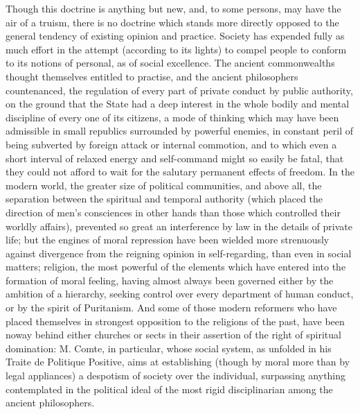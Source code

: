 \documentclass[12pt]{report}
\begin{document}
Though this doctrine is anything but new, and, to some persons, may have the air of a truism, there is no doctrine which stands more directly opposed to the general tendency of existing opinion and practice. Society has expended fully as much effort in the attempt (according to its lights) to compel people to conform to its notions of personal, as of social excellence. The ancient commonwealths thought themselves entitled to practise, and the ancient philosophers countenanced, the regulation of every part of private conduct by public authority, on the ground that the State had a deep interest in the whole bodily and mental discipline of every one of its citizens, a mode of thinking which may have been admissible in small republics surrounded by powerful enemies, in constant peril of being subverted by foreign attack or internal commotion, and to which even a short interval of relaxed energy and self-command might so easily be fatal, that they could not afford to wait for the salutary permanent effects of freedom. In the modern world, the greater size of political communities, and above all, the separation between the spiritual and temporal authority (which placed the direction of men's consciences in other hands than those which controlled their worldly affairs), prevented so great an interference by law in the details of private life; but the engines of moral repression have been wielded more strenuously against divergence from the reigning opinion in self-regarding, than even in social matters; religion, the most powerful of the elements which have entered into the formation of moral feeling, having almost always been governed either by the ambition of a hierarchy, seeking control over every department of human conduct, or by the spirit of Puritanism. And some of those modern reformers who have placed themselves in strongest opposition to the religions of the past, have been noway behind either churches or sects in their assertion of the right of spiritual domination: M. Comte, in particular, whose social system, as unfolded in his Traite de Politique Positive, aims at establishing (though by moral more than by legal appliances) a despotism of society over the individual, surpassing anything contemplated in the political ideal of the most rigid disciplinarian among the ancient philosophers.
\end{document}
